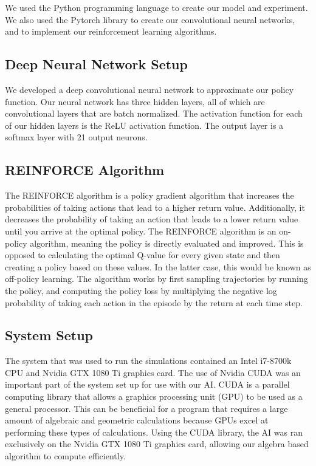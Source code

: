 \documentclass[12pt]{article}
\begin{document}
We used the Python programming language to create our model and experiment.  We also used the Pytorch library to create our convolutional neural networks, and to implement our reinforcement learning algorithms.

%
%
\subsection*{Deep Neural Network Setup}

We developed a deep convolutional neural network to approximate our policy function. Our neural network has three hidden layers, all of which are convolutional layers that are batch normalized.  The activation function for each of our hidden layers is the ReLU activation function. The output layer is a softmax layer with 21 output neurons.

%
%
\subsection*{REINFORCE Algorithm}

The REINFORCE algorithm is a policy gradient algorithm that increases the probabilities of taking actions that lead to a higher return value. Additionally, it decreases the probability of taking an action that leads to a lower return value until you arrive at the optimal policy.  The REINFORCE algorithm is an on-policy algorithm, meaning the policy is directly evaluated and improved. This is opposed to calculating the optimal Q-value for every given state and then creating a policy based on these values.  In the latter case, this would be known as off-policy learning. The algorithm works by first sampling trajectories by running the policy, and computing the policy loss by multiplying the negative log probability of taking each action in the episode by the return at each time step.

%
%
\subsection*{System Setup}

The system that was used to run the simulations contained an Intel i7-8700k CPU and Nvidia GTX 1080 Ti graphics card. The use of Nvidia CUDA was an important part of the system set up for use with our AI. CUDA is a parallel computing library that allows a graphics processing unit (GPU) to be used as a general processor. This can be beneficial for a program that requires a large amount of algebraic and geometric calculations because GPUs excel at performing these types of calculations. Using the CUDA library, the AI was ran exclusively on the Nvidia GTX 1080 Ti graphics card, allowing our algebra based algorithm to compute efficiently. 
\end{document}
